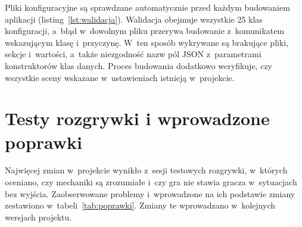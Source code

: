 Pliki konfiguracyjne są sprawdzane automatycznie przed każdym budowaniem aplikacji
(listing~\ref{lst:walidacja}). Walidacja obejmuje wszystkie 25 klas
konfiguracji, a~błąd w~dowolnym pliku przerywa budowanie z~komunikatem wskazującym klasę
i~przyczynę. W~ten sposób wykrywane są brakujące pliki, sekcje i~wartości, a~także
niezgodność nazw pól JSON z~parametrami konstruktorów klas danych. Proces budowania
dodatkowo weryfikuje, czy wszystkie sceny wskazane w~ustawieniach istnieją w~projekcie.

\section{Testy rozgrywki i wprowadzone poprawki}
\label{sec:poprawki}

Najwięcej zmian w~projekcie wynikło z~sesji testowych rozgrywki, w~których oceniano,
czy mechaniki są zrozumiałe i~czy gra nie stawia gracza w~sytuacjach bez wyjścia.
Zaobserwowane problemy i~wprowadzone na ich podstawie zmiany zestawiono
w~tabeli~\ref{tab:poprawki}. Zmiany te wprowadzano w~kolejnych wersjach projektu.

